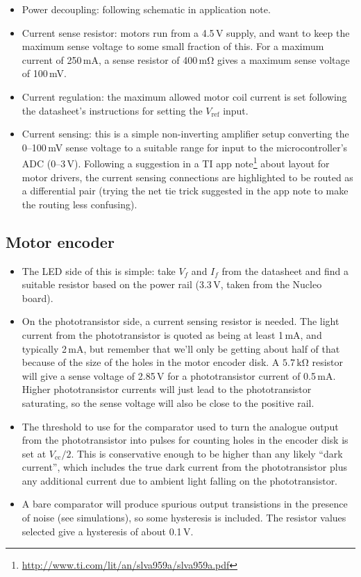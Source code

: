 \documentclass[a4paper,11pt,article]{memoir}
\begin{document}
\begin{itemize}
  \item{Power decoupling: following schematic in application note.}
  \item{Current sense resistor: motors run from a 4.5\,V supply, and
    want to keep the maximum sense voltage to some small fraction of
    this. For a maximum current of 250\,mA, a sense resistor of
    400\,$\mathrm{m\Omega}$ gives a maximum sense voltage of 100\,mV.}
  \item{Current regulation: the maximum allowed motor coil current is
    set following the datasheet's instructions for setting the
    $V_\mathrm{ref}$ input.}
  \item{Current sensing: this is a simple non-inverting amplifier
    setup converting the 0--100\,mV sense voltage to a suitable range
    for input to the microcontroller's ADC (0--3\,V). Following a
    suggestion in a TI app
    note\footnote{\url{http://www.ti.com/lit/an/slva959a/slva959a.pdf}}
    about layout for motor drivers, the current sensing connections
    are highlighted to be routed as a differential pair (trying the
    net tie trick suggested in the app note to make the routing less
    confusing).}
\end{itemize}

\subsection{Motor encoder}

\begin{itemize}
  \item{The LED side of this is simple: take $V_f$ and $I_f$ from the
    datasheet and find a suitable resistor based on the power rail
    (3.3\,V, taken from the Nucleo board).}
  \item{On the phototransistor side, a current sensing resistor is
    needed. The light current from the phototransistor is quoted as
    being at least 1\,mA, and typically 2\,mA, but remember that we'll
    only be getting about half of that because of the size of the
    holes in the motor encoder disk. A $5.7\,\mathrm{k\Omega}$
    resistor will give a sense voltage of 2.85\,V for a phototransistor
    current of 0.5\,mA. Higher phototransistor currents will just lead
    to the phototransistor saturating, so the sense voltage will also
    be close to the positive rail.}
  \item{The threshold to use for the comparator used to turn the
    analogue output from the phototransistor into pulses for counting
    holes in the encoder disk is set at $V_{\mathrm{cc}} / 2$. This is
    conservative enough to be higher than any likely ``dark current'',
    which includes the true dark current from the phototransistor plus
    any additional current due to ambient light falling on the
    phototransistor.}
  \item{A bare comparator will produce spurious output transistions in
    the presence of noise (see simulations), so some hysteresis is
    included. The resistor values selected give a hysteresis of about
    0.1\,V.}
\end{itemize}
\end{document}
